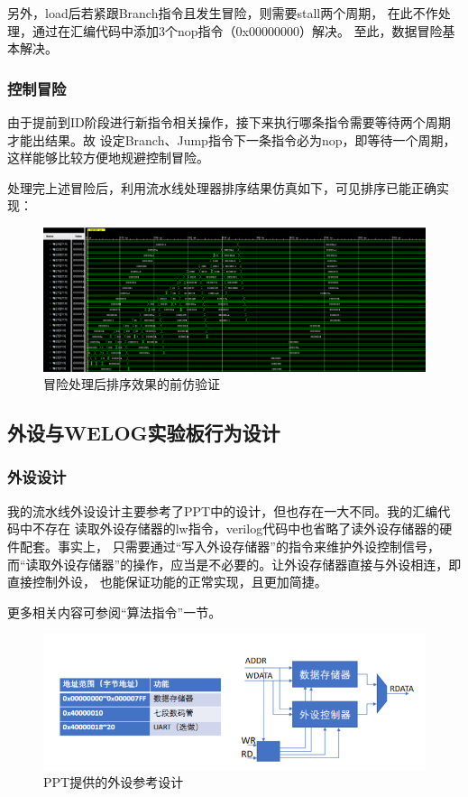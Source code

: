 \documentclass[10pt]{article}
\begin{document}
另外，load后若紧跟Branch指令且发生冒险，则需要stall两个周期，
在此不作处理，通过在汇编代码中添加3个nop指令（0x00000000）解决。
至此，数据冒险基本解决。
\subsubsection{控制冒险}
由于提前到ID阶段进行新指令相关操作，接下来执行哪条指令需要等待两个周期才能出结果。故
设定Branch、Jump指令下一条指令必为nop，即等待一个周期，这样能够比较方便地规避控制冒险。

处理完上述冒险后，利用流水线处理器排序结果仿真如下，可见排序已能正确实现：
\begin{figure}[H]
    \centering
    \includegraphics[scale=0.37]{mult.png}
    \caption{冒险处理后排序效果的前仿验证}
    \end{figure}
\subsection{外设与WELOG实验板行为设计}
\subsubsection{外设设计}
我的流水线外设设计主要参考了PPT中的设计，但也存在一大不同。我的汇编代码中不存在
读取外设存储器的lw指令，verilog代码中也省略了读外设存储器的硬件配套。事实上，
只需要通过“写入外设存储器”的指令来维护外设控制信号，
而“读取外设存储器”的操作，应当是不必要的。让外设存储器直接与外设相连，即直接控制外设，
也能保证功能的正常实现，且更加简捷。

更多相关内容可参阅“算法指令”一节。
\begin{figure}[H]
    \centering
    \includegraphics[scale=0.5]{exter.png}
    \caption{PPT提供的外设参考设计}
    \end{figure}
\end{document}
